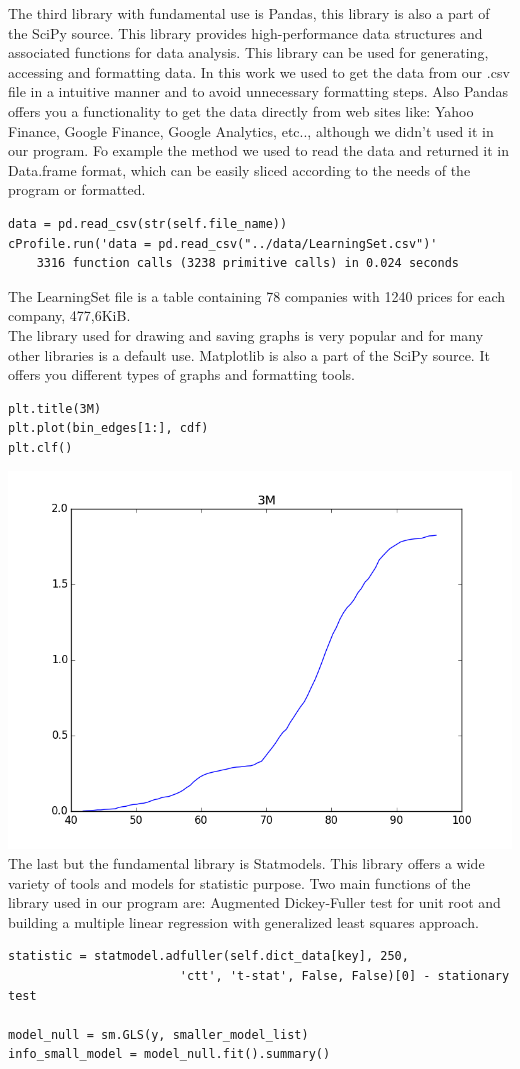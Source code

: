 \documentclass{article}
\begin{document}
The third library with fundamental use is Pandas, this library is also a part of the SciPy source. This library provides high-performance data structures and associated functions for data analysis. This library can be used for generating, accessing and formatting data. In this work we used to get the data from our .csv file in a intuitive manner and to avoid unnecessary formatting steps. Also Pandas offers you a functionality to get the data directly from web sites like: Yahoo Finance, Google Finance, Google Analytics, etc.., although we didn't used it in our program. Fo example the method we used to read the data and returned it in Data.frame format, which can be easily sliced according to the needs of the program or formatted.
\begin{verbatim}
data = pd.read_csv(str(self.file_name))
cProfile.run('data = pd.read_csv("../data/LearningSet.csv")'
    3316 function calls (3238 primitive calls) in 0.024 seconds
\end{verbatim}
The LearningSet file is a table containing 78 companies with 1240 prices for each company, 477,6KiB.\\
The library used for drawing and saving graphs is very popular and for many other libraries is a default use. Matplotlib is also a part of the SciPy source. It offers you different types of graphs and formatting tools.
\begin{verbatim}
plt.title(3M)
plt.plot(bin_edges[1:], cdf)
plt.clf()
\end{verbatim}
\includegraphics[scale=0.5]{PythonPlotExample.png} \\
The last but the fundamental library is Statmodels. This library offers a wide variety of tools and models for statistic purpose. Two main functions of the library used in our program are: Augmented Dickey-Fuller test for unit root and building a multiple linear regression with generalized least squares approach.
\begin{verbatim}
statistic = statmodel.adfuller(self.dict_data[key], 250, 
                        'ctt', 't-stat', False, False)[0] - stationary test
                        
model_null = sm.GLS(y, smaller_model_list)
info_small_model = model_null.fit().summary()
\end{verbatim}   
\end{document}
